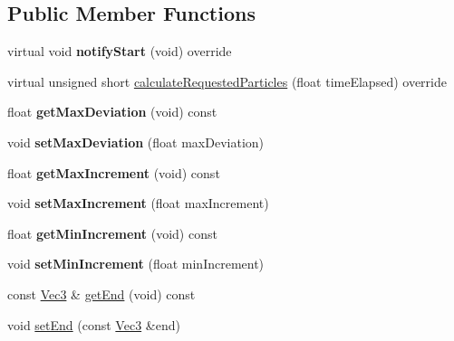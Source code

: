 \subsection*{Public Member Functions}
\begin{DoxyCompactItemize}
\item 
\mbox{\label{classPULineEmitter_aa9a96d9f988e491286354cf46a6d9969}} 
virtual void {\bfseries notify\+Start} (void) override
\item 
virtual unsigned short \hyperlink{classPULineEmitter_a74e5ce3953d092de3a380a136475e322}{calculate\+Requested\+Particles} (float time\+Elapsed) override
\item 
\mbox{\label{classPULineEmitter_ac1ea748c05897d571c4b15698c63c976}} 
float {\bfseries get\+Max\+Deviation} (void) const
\item 
\mbox{\label{classPULineEmitter_a983d1d81f61cf7b972767288dc8b1726}} 
void {\bfseries set\+Max\+Deviation} (float max\+Deviation)
\item 
\mbox{\label{classPULineEmitter_aa400da243d45073bdf9d5de755bd4859}} 
float {\bfseries get\+Max\+Increment} (void) const
\item 
\mbox{\label{classPULineEmitter_a6e1122f6cfdcbd76e09e5d7261c35862}} 
void {\bfseries set\+Max\+Increment} (float max\+Increment)
\item 
\mbox{\label{classPULineEmitter_a37ce76d1aa21f5cd2dc0f83bea2b8240}} 
float {\bfseries get\+Min\+Increment} (void) const
\item 
\mbox{\label{classPULineEmitter_adc7fc30d71ce4089a8501e458655acd8}} 
void {\bfseries set\+Min\+Increment} (float min\+Increment)
\item 
const \hyperlink{classVec3}{Vec3} \& \hyperlink{classPULineEmitter_ab12c183f1105751b783bd8846eb70693}{get\+End} (void) const
\item 
void \hyperlink{classPULineEmitter_ab52d86f473828f9e37f0a59244a02f43}{set\+End} (const \hyperlink{classVec3}{Vec3} \&end)
\item 
\mbox{\label{classPULineEmitter_a87f500929516aedefdb0305af77acb86}} 

\end{DoxyCompactItemize}
